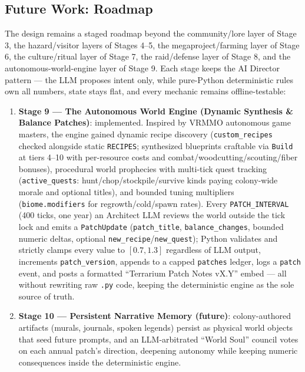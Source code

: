 \documentclass[10pt,a4paper]{article}
\begin{document}
\subsection{Future Work: Roadmap}
The design remains a staged roadmap beyond the community/lore layer of Stage 3, the hazard/visitor layers of Stages 4--5, the megaproject/farming layer of Stage 6, the culture/ritual layer of Stage 7, the raid/defense layer of Stage 8, and the autonomous-world-engine layer of Stage 9. Each stage keeps the AI Director pattern --- the LLM proposes intent only, while pure-Python deterministic rules own all numbers, state stays flat, and every mechanic remains offline-testable:

\begin{enumerate}
\item \textbf{Stage 9 --- The Autonomous World Engine (Dynamic Synthesis \& Balance Patches)}: implemented. Inspired by VRMMO autonomous game masters, the engine gained dynamic recipe discovery (\texttt{custom\_recipes} checked alongside static \texttt{RECIPES}; synthesized blueprints craftable via \texttt{Build} at tiers 4--10 with per-resource costs and combat/woodcutting/scouting/fiber bonuses), procedural world prophecies with multi-tick quest tracking (\texttt{active\_quests}: hunt/chop/stockpile/survive kinds paying colony-wide morale and optional titles), and bounded tuning multipliers (\texttt{biome.modifiers} for regrowth/cold/spawn rates). Every \texttt{PATCH\_INTERVAL} (400 ticks, one year) an Architect LLM reviews the world outside the tick lock and emits a \texttt{PatchUpdate} (\texttt{patch\_title}, \texttt{balance\_changes}, bounded numeric deltas, optional \texttt{new\_recipe}/\texttt{new\_quest}); Python validates and strictly clamps every value to $[0.7, 1.3]$ regardless of LLM output, increments \texttt{patch\_version}, appends to a capped \texttt{patches} ledger, logs a \texttt{patch} event, and posts a formatted ``Terrarium Patch Notes vX.Y'' embed --- all without rewriting raw \texttt{.py} code, keeping the deterministic engine as the sole source of truth.
\item \textbf{Stage 10 --- Persistent Narrative Memory (future)}: colony-authored artifacts (murals, journals, spoken legends) persist as physical world objects that seed future prompts, and an LLM-arbitrated ``World Soul'' council votes on each annual patch's direction, deepening autonomy while keeping numeric consequences inside the deterministic engine.
\end{enumerate}
\end{document}
